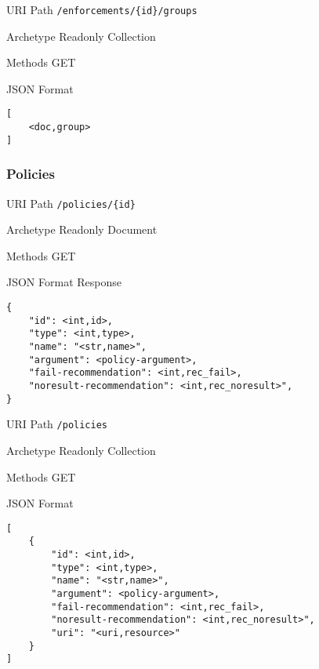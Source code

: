 \documentclass[10pt,a4paper]{scrartcl}
\begin{document}
\begin{mdframed}[style=def]
\begin{description*}
	\item[URI Path] \texttt{/enforcements/\{id\}/groups}
	\item[Archetype] Readonly Collection
	\item[Methods] GET
	\item[JSON Format] \hfill
\begin{lstlisting}
[
	<doc,group>
]
\end{lstlisting}
\end{description*}
\end{mdframed}

\pagebreak
\subsubsection{Policies}

\begin{mdframed}[style=def]
\begin{description*}
	\item[URI Path] \texttt{/policies/\{id\}}
	\item[Archetype] Readonly Document
	\item[Methods] GET
	\item[JSON Format Response] \hfill
\begin{lstlisting}
{
	"id": <int,id>,
	"type": <int,type>,
	"name": "<str,name>",
	"argument": <policy-argument>,
    "fail-recommendation": <int,rec_fail>,
    "noresult-recommendation": <int,rec_noresult>",
}
\end{lstlisting}
\end{description*}
\end{mdframed}

\begin{mdframed}[style=def]
\begin{description*}
	\item[URI Path] \texttt{/policies}
	\item[Archetype] Readonly Collection
	\item[Methods] GET
	\item[JSON Format] \hfill
\begin{lstlisting}
[
	{
		"id": <int,id>,
		"type": <int,type>,
		"name": "<str,name>",
		"argument": <policy-argument>,
        "fail-recommendation": <int,rec_fail>,
        "noresult-recommendation": <int,rec_noresult>",
		"uri": "<uri,resource>"
	}
]
\end{lstlisting}
\end{description*}
\end{mdframed}
\end{document}
